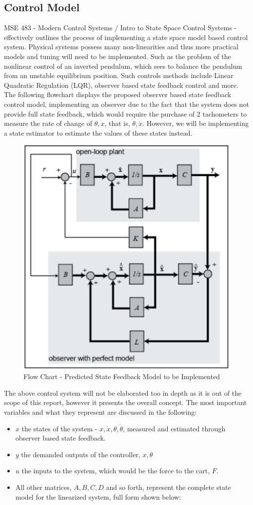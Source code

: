 \documentclass[12pt]{article}
\begin{document}
\subsection{Control Model}
MSE 483 - Modern Control Systems / Intro to State Space Control Systems - effectively outlines the process of implementing a state space model based control system. Physical systems possess many non-linearities and thus more practical models and tuning will need to be implemented. Such as the problem of the nonlinear control of an inverted pendulum, which sees to balance the pendulum from an unstable equilibrium position. Such controls methods include Linear Quadratic Regulation (LQR), observer based state feedback control and more. The following flowchart displays the proposed observer based state feedback control model, implementing an observer due to the fact that the system does not provide full state feedback, which would require the purchase of 2 tachometers to measure the rate of change of $\theta, x$, that is, $\dot{\theta}, \dot{x}$. However, we will be implementing a state estimator to estimate the values of these states instead.
\begin{figure}[H]
    \centering
    \includegraphics[width=.5\linewidth]{figures/flow.png}
    \caption{Flow Chart - Predicted State Feedback Model to be Implemented \cite{inv2}}
    \label{fig:fc}
\end{figure}
The above control system will not be elaborated too in depth as it is out of the scope of this report, however it presents the overall concept. The most important variables and what they represent are discussed in the following:
\begin{itemize}
    \item $x$ the states of the system - $x, \dot{x}, \theta, \dot{\theta}$, measured and estimated through observer based state feedback.
    \item $y$ the demanded outputs of the controller, $x, \theta$
    \item $u$ the inputs to the system, which would be the force to the cart, $F$.
    \item All other matrices, $A, B, C, D$ and so forth, represent the complete state model for the linearized system, full form shown below:
\end{itemize}
\end{document}
